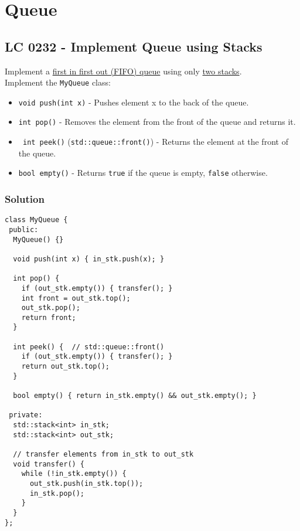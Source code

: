 \chapter{Queue}
\section{LC 0232 - Implement Queue using Stacks}
Implement a \ul{first in first out (FIFO) queue} using only \ul{two stacks}.\\

Implement the {\colorbox{CodeBackground}{\lstinline|MyQueue|}} class:
\begin{itemize}
\item {\colorbox{CodeBackground}{\lstinline|void push(int x)|}} - Pushes element x to the back of the queue.
\item {\colorbox{CodeBackground}{\lstinline|int pop()|}} - Removes the element from the front of the queue and returns it.
\item{\colorbox{CodeBackground}{\lstinline| int peek()|}} ({\colorbox{CodeBackground}{\lstinline|std::queue::front()|}}) - Returns the element at the front of the queue.
\item {\colorbox{CodeBackground}{\lstinline|bool empty()|}} - Returns {\colorbox{CodeBackground}{\lstinline|true|}} if the queue is empty, {\colorbox{CodeBackground}{\lstinline|false|}} otherwise.
\end{itemize}

\subsection*{Solution}
\begin{lstlisting}
class MyQueue {
 public:
  MyQueue() {}

  void push(int x) { in_stk.push(x); }

  int pop() {
    if (out_stk.empty()) { transfer(); }
    int front = out_stk.top();
    out_stk.pop();
    return front;
  }

  int peek() {  // std::queue::front()
    if (out_stk.empty()) { transfer(); }
    return out_stk.top();
  }

  bool empty() { return in_stk.empty() && out_stk.empty(); }

 private:
  std::stack<int> in_stk;
  std::stack<int> out_stk;

  // transfer elements from in_stk to out_stk
  void transfer() {
    while (!in_stk.empty()) {
      out_stk.push(in_stk.top());
      in_stk.pop();
    }
  }
};
\end{lstlisting}


